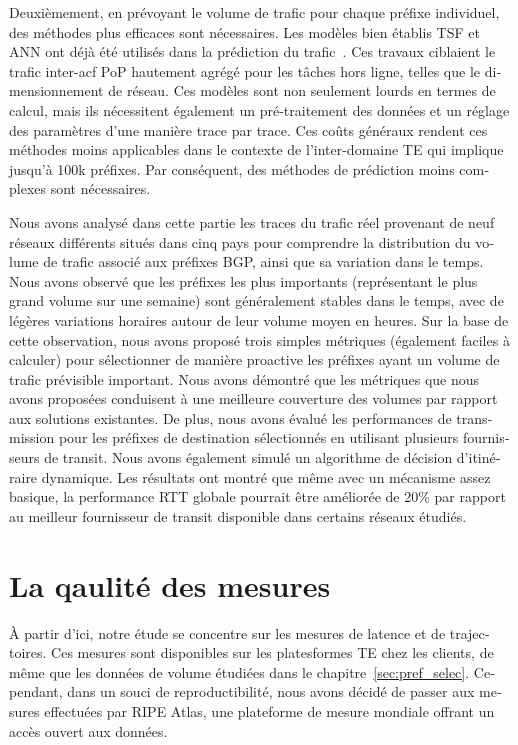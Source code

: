 \begin{otherlanguage}{french}
Deuxièmement, en prévoyant le volume de trafic pour chaque préfixe individuel, des méthodes plus efficaces sont nécessaires.
Les modèles bien établis \acf{TSF} et \acf{ANN} ont déjà été utilisés dans la prédiction du trafic~\cite{Papagiannaki2005, Cortez2006, Otoshi2013}.
Ces travaux ciblaient le trafic inter-acf {PoP} hautement agrégé pour les tâches hors ligne, telles que le dimensionnement de réseau.
Ces modèles sont non seulement lourds en termes de calcul, mais ils nécessitent également un pré-traitement des données et un réglage des paramètres d'une manière trace par trace. 
Ces coûts généraux rendent ces méthodes moins applicables dans le contexte de l'inter-domaine TE qui implique jusqu'à 100k préfixes. Par conséquent, des méthodes de prédiction moins complexes sont nécessaires.

Nous avons analysé dans cette partie les traces du trafic réel provenant de neuf réseaux différents situés dans cinq pays pour comprendre la distribution du volume de trafic associé aux préfixes BGP, ainsi que sa variation dans le temps.
Nous avons observé que les préfixes les plus importants (représentant le plus grand volume sur une semaine) sont généralement stables dans le temps, avec de légères variations horaires autour de leur volume moyen en heures.
Sur la base de cette observation, nous avons proposé trois simples
métriques (également faciles à calculer) pour sélectionner de manière proactive les préfixes ayant un volume de trafic prévisible important.
Nous avons démontré que les métriques que nous avons proposées conduisent à une meilleure couverture des volumes par rapport aux solutions existantes.
De plus, nous avons évalué les performances de transmission pour les préfixes de destination sélectionnés en utilisant plusieurs fournisseurs de transit.
Nous avons également simulé un algorithme de décision d'itinéraire dynamique.
Les résultats ont montré que même avec un mécanisme assez basique, la performance RTT globale pourrait être améliorée de 20\% par rapport au meilleur fournisseur de transit disponible dans certains réseaux étudiés.

\section{La qaulité des mesures}

À partir d'ici, notre étude se concentre sur les mesures de latence et de trajectoires.
Ces mesures sont disponibles sur les platesformes TE chez les clients, de même que les données de volume étudiées dans le chapitre~\ref{sec:pref_selec}.
Cependant, dans un souci de reproductibilité, nous avons décidé de passer aux mesures effectuées par RIPE Atlas, une plateforme de mesure mondiale offrant un accès ouvert aux données. 


\end{otherlanguage}
